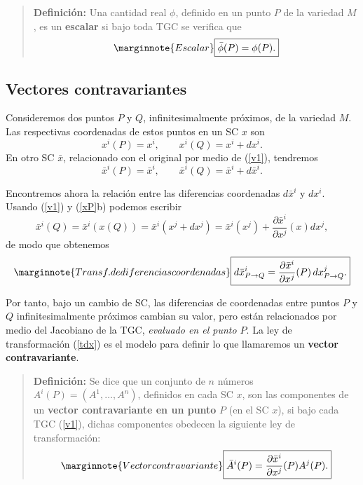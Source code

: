 \begin{quotation}
\textbf{Definición:} Una cantidad real $\phi$, definido en un punto $P$ de la variedad $M$, es un \textbf{escalar} si bajo toda TGC se verifica que
\begin{equation}\marginnote{Escalar}
\boxed{\bar{\phi}(P)=\phi(P).} \label{t1}
\end{equation}
\end{quotation}

\subsection{Vectores contravariantes}

Consideremos dos puntos $P$ y $Q$, infinitesimalmente próximos, de la variedad
$M$. Las respectivas coordenadas de estos puntos en un SC $x$ son
\begin{equation}
x^i(P)=x^i, \qquad x^i(Q)=x^i+dx^i.
\end{equation}
En otro SC $\bar{x}$, relacionado con el original por medio de (\ref{v1}),
tendremos
\begin{equation}
\bar{x}^i(P)=\bar{x}^i, \qquad \bar{x}^i(Q)=\bar{x}^i+d\bar{x}^i. \label{xP}
\end{equation}

Encontremos ahora la relación entre las diferencias coordenadas $d\bar{x}^i$ y $dx^i$.
Usando (\ref{v1}) y (\ref{xP}b) podemos escribir
\begin{equation}
\bar{x}^i(Q)=\bar{x}^i(x(Q))=\bar{x}^i(x^j+dx^j)=\bar{x}^i(x^j)+\frac{
\partial\bar{x}^i}{\partial x^j}(x)dx^j,
\end{equation}
de modo que obtenemos
\begin{equation}\marginnote{Transf. de diferencias coordenadas}
\boxed{d\bar{x}^i_{P\rightarrow Q}=\frac{\partial\bar{x}^i}{\partial
x^j}(P)\,dx^j_{P\rightarrow Q}.} \label{tdx}
\end{equation}

Por tanto, bajo un cambio de SC, las diferencias de coordenadas entre puntos $P$ y
$Q$ infinitesimalmente próximos cambian su valor, pero están relacionados por
medio del Jacobiano de la TGC, \textit{evaluado en el punto $P$}. La ley de
transformación (\ref{tdx}) es el modelo para definir lo que llamaremos un
\textbf{vector contravariante}.

\begin{quotation}
\textbf{Definición:} Se dice que un conjunto de $n$ números
$A^i(P)=(A^1,\dots ,A^n)$, definidos en cada SC $x$, son las componentes  de un
\textbf{vector contravariante en un punto} $P$ (en el SC $x$), si bajo cada TGC (\ref{v1}), dichas componentes obedecen la siguiente ley de transformación:
\begin{equation}\marginnote{Vector contravariante}
\boxed{\bar{A}^i(P)=\frac{\partial\bar{x}^i}{\partial x^j}(P)A^j(P).} \label{t9}
\end{equation}
\end{quotation}

